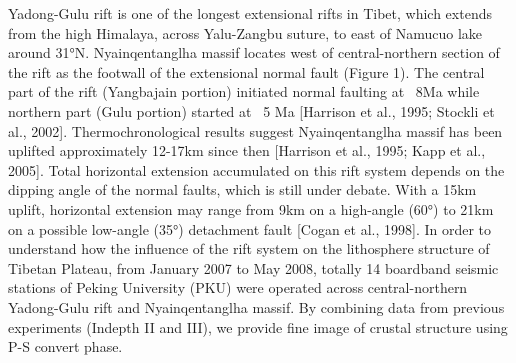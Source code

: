 Yadong-Gulu rift is one of the longest extensional rifts in Tibet, which extends from the high Himalaya, across Yalu-Zangbu suture, to east of Namucuo lake around 31°N. Nyainqentanglha massif locates west of central-northern section of the rift as the footwall of the extensional normal fault (Figure 1). The central part of the rift (Yangbajain portion) initiated normal faulting at ~8Ma while northern part (Gulu portion) started at ~5 Ma [Harrison et al., 1995; Stockli et al., 2002]. Thermochronological results suggest Nyainqentanglha massif has been uplifted approximately 12-17km since then [Harrison et al., 1995; Kapp et al., 2005]. Total horizontal extension accumulated on this rift system depends on the dipping angle of the normal faults, which is still under debate. With a 15km uplift, horizontal extension may range from 9km on a high-angle (60°) to 21km on a possible low-angle (35°) detachment fault [Cogan et al., 1998]. 
In order to understand how the influence of the rift system on the lithosphere structure of Tibetan Plateau, from January 2007 to May 2008, totally 14 boardband seismic stations of Peking University (PKU) were operated across central-northern Yadong-Gulu rift and Nyainqentanglha massif. By combining data from previous experiments (Indepth II and III), we provide fine image of crustal structure using P-S convert phase.
